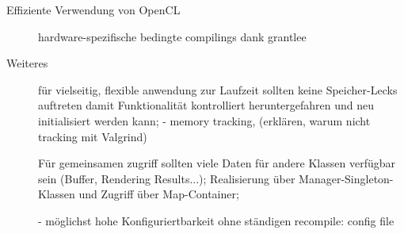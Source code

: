 \begin{description}
	\item[Effiziente Verwendung von OpenCL]
	 hardware-spezifische bedingte compilings dank grantlee

	\item[Weiteres]

	 für vielseitig, flexible anwendung zur Laufzeit sollten keine 	Speicher-Lecks auftreten damit Funktionalität 
	 kontrolliert heruntergefahren und neu initialisiert werden kann; 
	 	- memory tracking, (erklären, warum nicht tracking mit Valgrind)
	 
	 Für gemeinsamen zugriff sollten viele Daten für andere Klassen verfügbar sein (Buffer, Rendering Results...); 	
	 Realisierung über Manager-Singleton-Klassen und Zugriff über Map-Container;

	- möglichst hohe Konfiguriertbarkeit ohne ständigen recompile: config file

\end{description}
	
	
\clearpage
